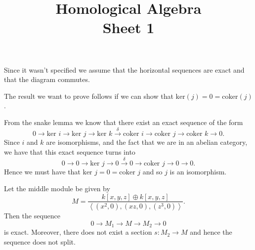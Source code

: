\documentclass[a4paper]{article}
\title{Homological Algebra \\ Sheet 1}
\begin{document}
\maketitle

\begin{exercise}{3}
  Since it wasn't specified we assume that the horizontal sequences are exact and that the diagram commutes.

  The result we want to prove follows if we can show that $ \text{ker}(j) = 0 = \text{coker}(j) $.

  From the snake lemma we know that there exist an exact sequence of the form
  \begin{equation*}
    0 \to \text{ker }i \to \text{ker }j \to \text{ker }k \xrightarrow{\delta} \text{coker }i \to \text{coker } j \to \text{coker }k \to 0.
  \end{equation*}
  Since $ i $ and $ k $ are isomorphisms, and the fact that we are in an abelian category, we have that this exact sequence turns into
  \begin{equation*}
    0 \to 0 \to \text{ker }j \to 0 \xrightarrow{\delta} 0 \to \text{coker }j \to 0 \to 0
  .\end{equation*}
  Hence we must have that $ \text{ker }j = 0 = \text{coker } j $ and so $ j $ is an isomorphism.
\end{exercise}

\begin{exercise}{4}
  Let the middle module be given by
  \begin{equation*}
    M = \frac{k[x,y,z] \oplus k[x,y,z]}{\left\langle (x^{2}, 0), (xz, 0), (z^{3}, 0) \right\rangle}
  .\end{equation*}
  Then the sequence
  \begin{equation*}
  0 \to M_1 \to M \to M_2 \to 0
  \end{equation*}
  is exact. Moreover, there does not exist a section $ s: M_2 \to M $ and hence the sequence does not split.
\end{exercise}
\end{document}
